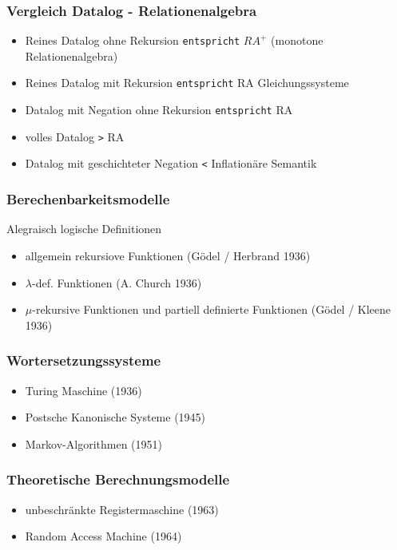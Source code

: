 \documentclass[12pt, a4paper]{article}
\begin{document}
\subsubsection*{Vergleich Datalog - Relationenalgebra}
\begin{itemize}
	\item Reines Datalog ohne Rekursion \texttt{entspricht} $RA^+$ (monotone Relationenalgebra)
	\item Reines Datalog mit Rekursion \texttt{entspricht} RA Gleichungssysteme
	\item Datalog mit Negation ohne Rekursion \texttt{entspricht} RA
	\item volles Datalog \texttt{>} RA
	\item Datalog mit geschichteter Negation \texttt{<} Inflationäre Semantik
\end{itemize}

\subsubsection*{Berechenbarkeitsmodelle}
Alegraisch logische Definitionen
\begin{itemize}
	\item allgemein rekursiove Funktionen (Gödel / Herbrand 1936)
	\item $\lambda$-def. Funktionen (A. Church 1936) 
	\item $\mu$-rekursive Funktionen und partiell definierte Funktionen (Gödel / Kleene 1936)
\end{itemize}

\subsubsection*{Wortersetzungssysteme}
\begin{itemize}
	\item Turing Maschine (1936)
	\item Postsche Kanonische Systeme (1945)
	\item Markov-Algorithmen (1951)
\end{itemize}

\subsubsection*{Theoretische Berechnungsmodelle}
\begin{itemize}
	\item unbeschränkte Registermaschine (1963)
	\item Random Access Machine (1964)
\end{itemize}
\end{document}

